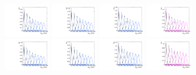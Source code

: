 \begin{figure}[htbp]
  \includegraphics[width=0.18\textwidth]{fig/2Dfit/templateSignalVsMX_fromDC_VBFGbuToWW_MVV_mu_HP_nobb_LDy.pdf}
  \includegraphics[width=0.18\textwidth]{fig/2Dfit/templateSignalVsMX_fromDC_VBFRadToWW_MVV_mu_HP_nobb_LDy.pdf}
  \includegraphics[width=0.18\textwidth]{fig/2Dfit/templateSignalVsMX_fromDC_VBFZprToWW_MVV_mu_HP_nobb_LDy.pdf}
  \includegraphics[width=0.18\textwidth]{fig/2Dfit/templateSignalVsMX_fromDC_VBFWprToWZ_MVV_mu_HP_nobb_LDy.pdf}\\
  \includegraphics[width=0.18\textwidth]{fig/2Dfit/templateSignalVsMX_fromDC_VBFGbuToWW_MVV_mu_LP_nobb_LDy.pdf}
  \includegraphics[width=0.18\textwidth]{fig/2Dfit/templateSignalVsMX_fromDC_VBFRadToWW_MVV_mu_LP_nobb_LDy.pdf}
  \includegraphics[width=0.18\textwidth]{fig/2Dfit/templateSignalVsMX_fromDC_VBFZprToWW_MVV_mu_LP_nobb_LDy.pdf}
  \includegraphics[width=0.18\textwidth]{fig/2Dfit/templateSignalVsMX_fromDC_VBFWprToWZ_MVV_mu_LP_nobb_LDy.pdf}\\

\end{figure}
